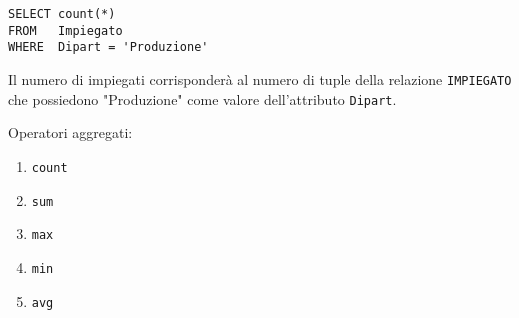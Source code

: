 \begin{lstlisting}
SELECT count(*)
FROM   Impiegato
WHERE  Dipart = 'Produzione'
\end{lstlisting}

Il numero di impiegati corrisponderà al numero di tuple della relazione \texttt{IMPIEGATO} che possiedono "Produzione" come valore dell'attributo \texttt{Dipart}.

Operatori aggregati:

\begin{enumerate}
	\item \texttt{count}
	\item \texttt{sum}
	\item \texttt{max}
	\item \texttt{min}
	\item \texttt{avg}
\end{enumerate}

